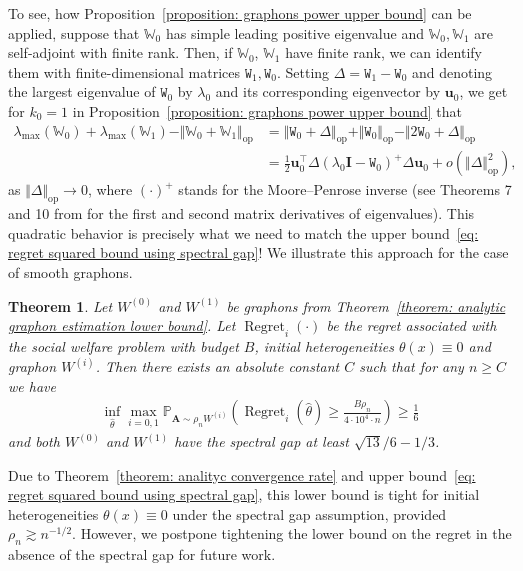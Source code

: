 \documentclass[11pt]{article}
\newcommand{\op}{\mathrm{op}}
\newcommand{\bA}{\bm{A}}
\newcommand{\bu}{\bm{u}}
\newcommand{\bI}{\bm{I}}
\newcommand{\bbW}{\mathbb{W}}
\newcommand{\bbP}{\mathbb{P}}
\newcommand{\<}{\langle}
\renewcommand{\>}{\rangle}
\newcommand{\regret}{\operatorname{Regret}}
\newcommand{\ttW}{\mathtt{W}}
\theoremstyle{plain}
\newtheorem{theorem}{Theorem}
\theoremstyle{definition}
\theoremstyle{remark}
\begin{document}
{To see, how Proposition~\ref{proposition: graphons power upper bound} can be applied, suppose that $\bbW_0$ has simple leading positive eigenvalue and $\bbW_0, \bbW_1$ are self-adjoint with finite rank. Then, if $\bbW_0$, $\bbW_1$ have finite rank, we can identify them with finite-dimensional matrices $\ttW_1, \ttW_0$. Setting $\Delta = \ttW_1 - \ttW_0$ and denoting the largest eigenvalue of $\ttW_0$ by $\lambda_0$ and its corresponding eigenvector by $\bu_0$, we get for $k_0 = 1$ in Proposition~\ref{proposition: graphons power upper bound} that
\begin{align*}
    \lambda_{\max}(\bbW_0) + \lambda_{\max}(\bbW_1 )  - \Vert \bbW_0+ \bbW_1 \Vert_{\op} & = 
    \Vert \ttW_0 + \Delta \Vert_{\op} + \Vert \ttW_0 \Vert_{\op} - \Vert 2 \ttW_0 + \Delta \Vert_{\op} \\
    & = \frac{1}{2} \bu_0^\top \Delta (\lambda_0 \bI - \ttW_0)^{+} \Delta \bu_0 + o(\Vert \Delta \Vert_{\op}^2),
\end{align*}
as $\Vert \Delta \Vert_{\op} \to 0$, where $(\cdot)^+$ stands for the Moore--Penrose inverse (see Theorems 7 and 10 \newline from \citep{magnus2019matrix} for the first and second matrix derivatives of eigenvalues). This quadratic behavior is precisely what we need to match the upper bound~\eqref{eq: regret squared bound using spectral gap}! We illustrate this approach for the case of smooth graphons.

\begin{theorem}
\label{theorem: regret lower bound smooth graphons}
Let $W^{(0)}$ and $W^{(1)}$ be graphons from Theorem~\ref{theorem: analytic graphon estimation lower bound}. Let $\regret_i(\cdot)$ be the regret associated with the social welfare problem with budget $B$, initial heterogeneities $\theta(x) \equiv 0$ and graphon $W^{(i)}$. Then there exists an absolute constant $C$ such that for any $n \ge C$ we have
\begin{align*}
     \inf_{\widehat{\theta}} \max_{i = 0, 1} \bbP_{\bA \sim \rho_n W^{(i)}} \left ( \regret_i(\widehat{\theta}) \ge \frac{B\rho_n}{4 \cdot 10^4 \cdot n} \right ) \ge \frac{1}{6}
\end{align*}
and both $W^{(0)}$ and $W^{(1)}$ have the spectral gap at least $\sqrt{13}/6 - 1/3$.
\end{theorem}

Due to Theorem~\ref{theorem: analityc convergence rate} and upper bound~\eqref{eq: regret squared bound using spectral gap}, this lower bound is tight for initial heterogeneities $\theta(x) \equiv 0$ under the spectral gap assumption, provided $\rho_n \gtrsim n^{-1/2}$. However, we postpone tightening the lower bound on the regret in the absence of the spectral gap for future work.
 }
\end{document}
